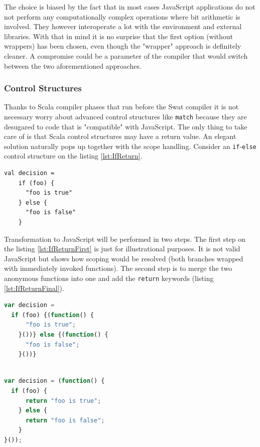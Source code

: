 \documentclass[12pt,a4paper]{report}
\begin{document}
The choice is biased by the fact that in most cases JavaScript applications do not not perform any computationally complex operations where bit arithmetic is involved. They however interoperate a lot with the environment and external libraries. With that in mind it is no surprise that the first option (without wrappers) has been chosen, even though the "wrapper" approach is definitely cleaner. A compromise could be a parameter of the compiler that would switch between the two aforementioned approaches.

\subsubsection*{Control Structures}

Thanks to Scala compiler phases that run before the Swat compiler it is not necessary worry about advanced control structures like \texttt{match} because they are desugared to code that is "compatible" with JavaScript. The only thing to take care of is that Scala control structures may have a return value. An elegant solution naturally pops up together with the scope handling. Consider an \texttt{if}-\texttt{else} control structure on the listing \ref{lst:IfReturn}.

\begin{lstlisting}[caption={A condition with return value.},label={lst:IfReturn}]
val decision = 
	if (foo) {
	  "foo is true"
	} else {
	  "foo is false"
	}
\end{lstlisting}

Transformation to JavaScript will be performed in two steps. The first step on the listing \ref{lst:IfReturnFirst} is just for illustrational purposes. It is not valid JavaScript but shows how scoping would be resolved (both branches wrapped with immediately invoked functions). The second step is to merge the two anonymous functions into one and add the \texttt{return} keywords (listing \ref{lst:IfReturnFinal}).

\begin{center}
\begin{minipage}{.48\textwidth}
  \begin{lstlisting}[language=JavaScript,caption={The first step of condition compilation.},label={lst:IfReturnFirst},showlines=true]
var decision =
  if (foo) {(function() {
	  "foo is true";
	}())} else {(function() {
	  "foo is false";
	}())}
	
  \end{lstlisting}
\end{minipage}
\hfill
\begin{minipage}{.48\textwidth}
  \begin{lstlisting}[language=JavaScript,caption={The result of condition compilation.},label={lst:IfReturnFinal}]
var decision = (function() {
  if (foo) {
	  return "foo is true";
	} else {
	  return "foo is false";
	}
}());
  \end{lstlisting}
\end{minipage}
\end{center}
\end{document}
